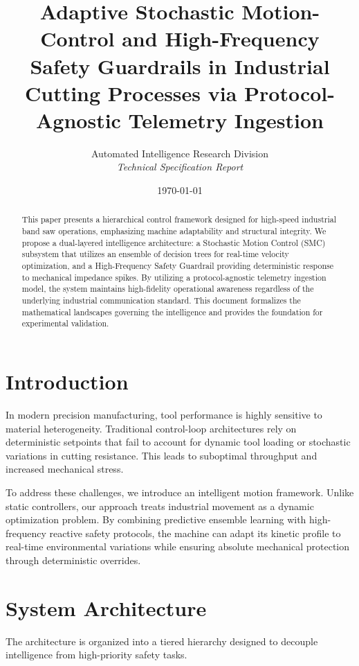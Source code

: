 \documentclass[letterpaper]{article}
\title{\textbf{Adaptive Stochastic Motion-Control and High-Frequency\\Safety Guardrails in Industrial Cutting Processes via Protocol-Agnostic Telemetry
Ingestion}}
\author{Automated Intelligence Research Division \\ \textit{Technical Specification Report}}
\date{\today}
\begin{document}
\maketitle

\begin{abstract}
This paper presents a hierarchical control framework designed for high-speed industrial band saw operations, emphasizing machine adaptability and
structural integrity. We propose a dual-layered intelligence architecture: a Stochastic Motion Control (SMC) subsystem that utilizes an ensemble of
decision trees for real-time velocity optimization, and a High-Frequency Safety Guardrail providing deterministic response to mechanical impedance
spikes. By utilizing a protocol-agnostic telemetry ingestion model, the system maintains high-fidelity operational awareness regardless of the underlying
industrial communication standard. This document formalizes the mathematical landscapes governing the intelligence and provides the foundation for
experimental validation.
\end{abstract}

\section{Introduction}
In modern precision manufacturing, tool performance is highly sensitive to material heterogeneity. Traditional control-loop architectures rely on
deterministic setpoints that fail to account for dynamic tool loading or stochastic variations in cutting resistance. This leads to suboptimal throughput
and increased mechanical stress.

To address these challenges, we introduce an intelligent motion framework. Unlike static controllers, our approach treats industrial movement as a
dynamic optimization problem. By combining predictive ensemble learning with high-frequency reactive safety protocols, the machine can adapt its kinetic
profile to real-time environmental variations while ensuring absolute mechanical protection through deterministic overrides.

\section{System Architecture}
The architecture is organized into a tiered hierarchy designed to decouple intelligence from high-priority safety tasks.
\end{document}
